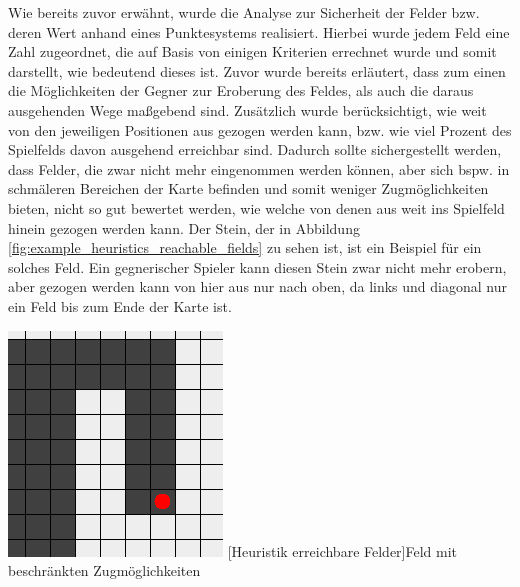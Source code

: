 \documentclass[12pt,a4paper,bibliography=totocnumbered,listof=totocnumbered]{article}
\begin{document}
Wie bereits zuvor erwähnt, wurde die Analyse zur Sicherheit der Felder bzw. deren Wert anhand eines Punktesystems realisiert. Hierbei wurde jedem Feld eine Zahl zugeordnet, die auf Basis von einigen Kriterien errechnet wurde und somit darstellt, wie bedeutend dieses ist. Zuvor wurde bereits erläutert, dass zum einen die Möglichkeiten der Gegner zur Eroberung des Feldes, als auch die daraus ausgehenden Wege maßgebend sind. Zusätzlich wurde berücksichtigt, wie weit von den jeweiligen Positionen aus gezogen werden kann, bzw. wie viel Prozent des Spielfelds davon ausgehend erreichbar sind. Dadurch sollte sichergestellt werden, dass Felder, die zwar nicht mehr eingenommen werden können, aber sich bspw. in schmäleren Bereichen der Karte befinden und somit weniger Zugmöglichkeiten bieten, nicht so gut bewertet werden, wie welche von denen aus weit ins Spielfeld hinein gezogen werden kann. Der Stein, der in Abbildung \ref{fig:example_heuristics_reachable_fields} zu sehen ist, ist ein Beispiel für ein solches Feld. Ein gegnerischer Spieler kann diesen Stein zwar nicht mehr erobern, aber gezogen werden kann von hier aus nur nach oben, da links und diagonal nur ein Feld bis zum Ende der Karte ist.

\vspace{1em}
\begin{minipage}{\linewidth}
	\centering
	\includegraphics[width=0.5\linewidth]{pics/heuristics_reachable_fields.png}
	[Heuristik erreichbare Felder]{Feld mit beschränkten Zugmöglichkeiten}
	\label{fig:example_heuristics_reachable_fields}
\end{minipage}
\\
\end{document}

